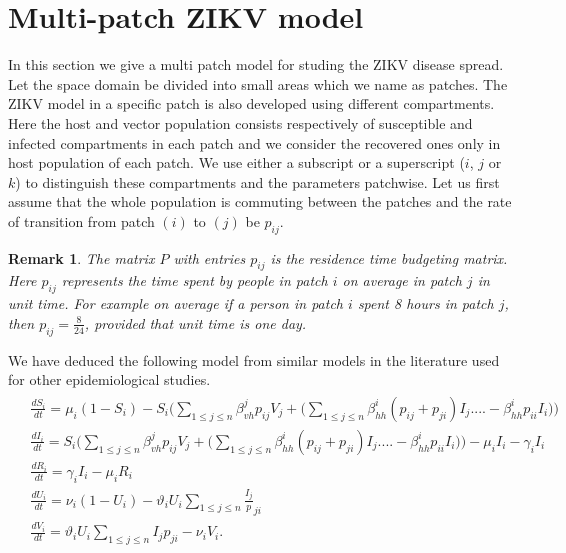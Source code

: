 \documentclass{article}
\newtheorem{remark}[theorem]{Remark}
\begin{document}
\section{Multi-patch ZIKV model}\label{section2}
 In this section we give a multi patch model for studing the ZIKV disease spread. Let the space domain be divided into small areas which we name as patches. The ZIKV model in a specific patch is also developed using different compartments. Here the host and vector population consists respectively of susceptible and infected compartments in each patch and we consider the recovered ones only in host population of each patch. We use either a subscript or a superscript ($i$, $j$ or $k$) to distinguish these compartments and the parameters patchwise. Let us first assume that the whole population is commuting between the patches and the rate of transition from patch $\left(i\right)$ to $
\left(j\right)$ be $p_{ij}$.
\begin{remark}
	The matrix $P$ with entries $p_{ij}$ is the residence time budgeting matrix. Here $p_{ij}$ represents the time spent by people in patch $i$ on average in patch $j$ in unit time\cite{P_matrix}. For example on average if a person in patch $i$ spent 8 hours in patch $j$, then $p_{ij} = \frac{8}{24}$, provided that unit time is one day.
\end{remark}
 We have deduced the following model from similar models in the literature used for other epidemiological studies\cite{Yashika}.
\begin{align*}
\begin{split}
&\frac{d S_{i}}{dt}=\mu_{i}\left( 1-S_{i}\right)-S_{i}\Bigg(\sum_{1\leq j\leq n}\beta_{vh}^{j}p_{ij}V_{j}+\Bigg(\sum_{1\leq j\leq n}\beta_{hh}^{i}\left(p_{ij}+p_{ji}\right){I_{j}}\Bigg.\Bigg.\Bigg.\Bigg.-\beta_{hh}^{i}p_{ii}{I_{i}}\Bigg)\Bigg)\\
%
%
&\frac{dI_{i}}{dt}=S_{i}\Bigg(\sum_{1\leq j\leq n}\beta_{vh}^{j}p_{ij}V_{j}+\Bigg(\sum_{1\leq j\leq n}\beta_{hh}^{i}\left(p_{ij}+p_{ji}\right){I_{j}}\Bigg.\Bigg.\Bigg.\Bigg.-\beta_{hh}^{i}p_{ii}{I_{i}}\Bigg)\Bigg)-\mu_{i}I_{i}-\gamma_{i}I_{i}\\
%
%
&\frac{d R_{i}}{dt}= \gamma_{i}I_{i}-\mu_{i}R_{i}\\
%
%
&\frac{d U_{i}}{dt}= \nu_{i}\left( 1-U_{i}\right) -\vartheta_{i}U_{i}\sum_{1\leq j\leq n}\frac{I_{j}}p_{ji}\\
%
%
&\frac{dV_{i}}{dt}=\vartheta_{i}U_{i}\sum_{1\leq j\leq n}{I_{j}}p_{ji}-\nu_{i}V_{i}.
\end{split}
\end{align*}
\end{document}
